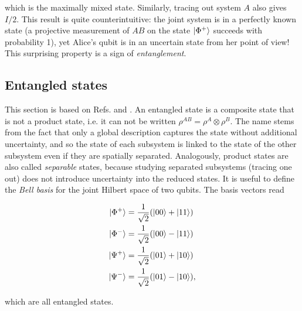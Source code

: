 \noindent which is the maximally mixed state. Similarly, tracing out system $A$ also gives $I/2$. This result is quite counterintuitive: the joint system is in a perfectly known state (a projective measurement of $AB$ on the state $\ket{\Phi^+}$ succeeds with probability 1), yet Alice's qubit is in an uncertain state from her point of view! This surprising property is a sign of \textit{entanglement}.



\subsection{Entangled states}

This section is based on Refs. \cite{horodecki_quantum_2009} and \cite{brunner_bell_2014}. An entangled state is a composite state that is not a product state, i.e. it can not be written $\rho^{AB} = \rho^A \otimes \rho^B$. The name stems from the fact that only a global description captures the state without additional uncertainty, and so the state of each subsystem is linked to the state of the other subsystem even if they are spatially separated. Analogously, product states are also called \textit{separable} states, because studying separated subsystems (tracing one out) does not introduce uncertainty into the reduced states. It is useful to define the \textit{Bell basis} for the joint Hilbert space of two qubits. The basis vectors read

\begin{align}
    \ket{\Phi^+} &= \frac{1}{\sqrt{2}} (\ket{00} + \ket{11})\\
    \ket{\Phi^-} &= \frac{1}{\sqrt{2}} (\ket{00} - \ket{11})\\
    \ket{\Psi^+} &= \frac{1}{\sqrt{2}} (\ket{01} + \ket{10})\\
    \ket{\Psi^-} &= \frac{1}{\sqrt{2}} (\ket{01} - \ket{10}),
\end{align}

\noindent which are all entangled states. %

